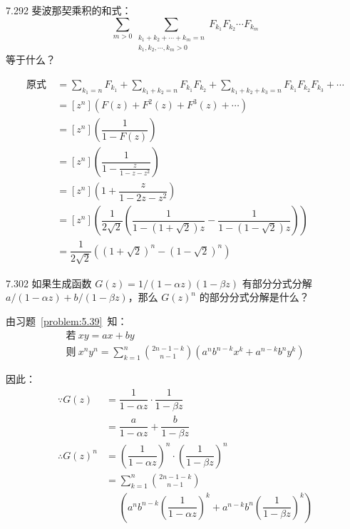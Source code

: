 \begin{problem}{7.29}{2}
  斐波那契乘积的和式：
  \[
    \sum_{m > 0} \sum_{\substack{k_1 + k_2 + \cdots + k_m = n \\ k_1, k_2, \cdots, k_m > 0}} F_{k_1} F_{k_2} \cdots F_{k_m}
  \]
  等于什么？
\end{problem}

\begin{align*}
  \text{原式} \ &= \sum_{k_1 = n} F_{k_1} + \sum_{k_1 + k_2 = n} F_{k_1} F_{k_2} + \sum_{k_1 + k_2 + k_3 = n} F_{k_1} F_{k_2} F_{k_3} + \cdots \\
  &= [z^n] \left( F(z) + F^2(z) + F^3(z) + \cdots \right) \\
  &= [z^n] \left( \dfrac{1}{1-F(z)} \right) \\
  &= [z^n] \left( \dfrac{1}{1 - \frac{z}{1-z-z^2}} \right) \\
  &= [z^n] \left( 1 + \dfrac{z}{1-2z-z^2} \right) \\
  &= [z^n] \left( \dfrac{1}{2 \sqrt{2}} ( \dfrac{1}{1-(1+\sqrt{2})z} - \dfrac{1}{1-(1-\sqrt{2})z} ) \right) \\
  &= \dfrac{1}{2\sqrt{2}} \left( (1+\sqrt{2})^n - (1-\sqrt{2})^n \right)
\end{align*}

\begin{problem}{7.30}{2}
  如果生成函数 \( G(z) = 1 / (1 - \alpha z) (1 - \beta z) \) 有部分分式分解 \( a / (1 - \alpha z) + b / (1 - \beta z) \)，那么 \( G(z)^n \) 的部分分式分解是什么？
\end{problem}

由习题~\ref{problem:5.39}~知：
\begin{gather*}
  \text{若} \ xy = ax + by \\
  \text{则} \ x^n y^n = \sum_{k=1}^n \binom{2n-1-k}{n-1} (a^n b^{n-k} x^k + a^{n-k} b^n y^k)
\end{gather*}

因此：
\begin{align*}
  \because G(z) &= \dfrac{1}{1-\alpha z} \cdot \dfrac{1}{1-\beta z} \\
  &= \dfrac{a}{1-\alpha z} + \dfrac{b}{1-\beta z} \\
  \therefore G(z)^n &= \left( \dfrac{1}{1-\alpha z} \right)^n \cdot \left( \dfrac{1}{1-\beta z} \right)^n \\
  &= \sum_{k=1}^n \binom{2n-1-k}{n-1} \\
  & \phantom{=} \left( a^n b^{n-k} \left( \dfrac{1}{1-\alpha z} \right)^k + a^{n-k} b^n \left( \dfrac{1}{1-\beta z} \right)^k \right)
\end{align*}

